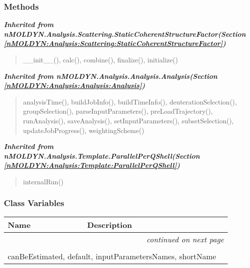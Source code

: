 
  \subsubsection{Methods}


\large{\textbf{\textit{Inherited from nMOLDYN.Analysis.Scattering.StaticCoherentStructureFactor\textit{(Section \ref{nMOLDYN:Analysis:Scattering:StaticCoherentStructureFactor})}}}}

\begin{quote}
\_\_init\_\_(), calc(), combine(), finalize(), initialize()
\end{quote}

\large{\textbf{\textit{Inherited from nMOLDYN.Analysis.Analysis.Analysis\textit{(Section \ref{nMOLDYN:Analysis:Analysis:Analysis})}}}}

\begin{quote}
analysisTime(), buildJobInfo(), buildTimeInfo(), deuterationSelection(), groupSelection(), parseInputParameters(), preLoadTrajectory(), runAnalysis(), saveAnalysis(), setInputParameters(), subsetSelection(), updateJobProgress(), weightingScheme()
\end{quote}

\large{\textbf{\textit{Inherited from nMOLDYN.Analysis.Template.ParallelPerQShell\textit{(Section \ref{nMOLDYN:Analysis:Template:ParallelPerQShell})}}}}

\begin{quote}
internalRun()
\end{quote}


  \subsubsection{Class Variables}

    \vspace{-1cm}
\hspace{\varindent}\begin{longtable}{|p{\varnamewidth}|p{\vardescrwidth}|l}
\cline{1-2}
\cline{1-2} \centering \textbf{Name} & \centering \textbf{Description}& \\
\cline{1-2}
\endhead\cline{1-2}\multicolumn{3}{r}{\small\textit{continued on next page}}\\\endfoot\cline{1-2}
\endlastfoot\multicolumn{2}{|l|}{\textit{Inherited from nMOLDYN.Analysis.Scattering.StaticCoherentStructureFactor \textit{(Section \ref{nMOLDYN:Analysis:Scattering:StaticCoherentStructureFactor})}}}\\
\multicolumn{2}{|p{\varwidth}|}{\raggedright canBeEstimated, default, inputParametersNames, shortName}\\
\cline{1-2}
\end{longtable}

